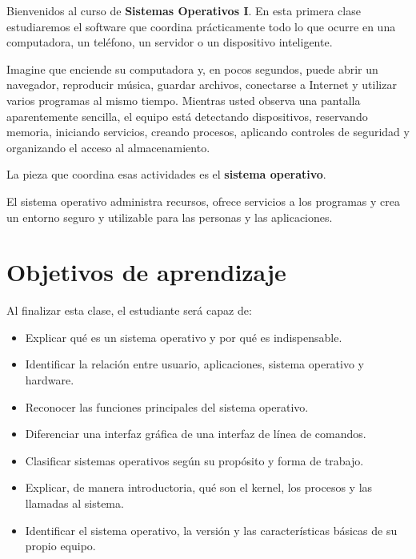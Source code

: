 \documentclass[
  spanish,
  letterpaper,
]{scrbook}
\providecommand{\tightlist}{%
  \setlength{\itemsep}{0pt}\setlength{\parskip}{0pt}}
\begin{document}
Bienvenidos al curso de \textbf{Sistemas Operativos I}. En esta primera
clase estudiaremos el software que coordina prácticamente todo lo que
ocurre en una computadora, un teléfono, un servidor o un dispositivo
inteligente.

Imagine que enciende su computadora y, en pocos segundos, puede abrir un
navegador, reproducir música, guardar archivos, conectarse a Internet y
utilizar varios programas al mismo tiempo. Mientras usted observa una
pantalla aparentemente sencilla, el equipo está detectando dispositivos,
reservando memoria, iniciando servicios, creando procesos, aplicando
controles de seguridad y organizando el acceso al almacenamiento.

La pieza que coordina esas actividades es el \textbf{sistema operativo}.

\begin{tcolorbox}[enhanced jigsaw, arc=.35mm, bottomrule=.15mm, bottomtitle=1mm, breakable, colback=white, colbacktitle=quarto-callout-note-color!10!white, colframe=quarto-callout-note-color-frame, coltitle=black, left=2mm, leftrule=.75mm, opacityback=0, opacitybacktitle=0.6, rightrule=.15mm, title=\textcolor{quarto-callout-note-color}{\faInfo}\hspace{0.5em}{Idea central de la clase}, titlerule=0mm, toprule=.15mm, toptitle=1mm]

El sistema operativo administra recursos, ofrece servicios a los
programas y crea un entorno seguro y utilizable para las personas y las
aplicaciones.

\end{tcolorbox}

\section{Objetivos de aprendizaje}\label{objetivos-de-aprendizaje}

Al finalizar esta clase, el estudiante será capaz de:

\begin{itemize}
\tightlist
\item
  Explicar qué es un sistema operativo y por qué es indispensable.
\item
  Identificar la relación entre usuario, aplicaciones, sistema operativo
  y hardware.
\item
  Reconocer las funciones principales del sistema operativo.
\item
  Diferenciar una interfaz gráfica de una interfaz de línea de comandos.
\item
  Clasificar sistemas operativos según su propósito y forma de trabajo.
\item
  Explicar, de manera introductoria, qué son el kernel, los procesos y
  las llamadas al sistema.
\item
  Identificar el sistema operativo, la versión y las características
  básicas de su propio equipo.
\end{itemize}
\end{document}
